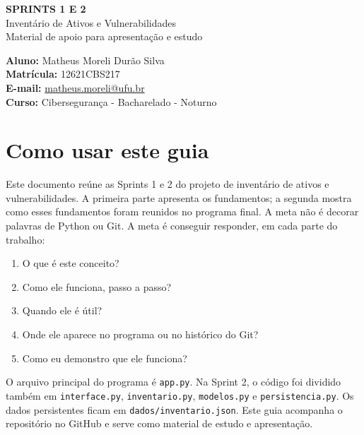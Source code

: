 \documentclass[11pt,a4paper]{article}
\begin{document}
\begin{titlepage}
\thispagestyle{empty}
\centering
\vspace*{3.2cm}

{\Large\textbf{SPRINTS 1 E 2}}\\[0.5cm]
{\LARGE Inventário de Ativos e Vulnerabilidades}\\[1.2cm]

{\large Material de apoio para apresentação e estudo}\\[3.2cm]

\begin{flushleft}
\large
\textbf{Aluno:} Matheus Moreli Durão Silva\\[0.35cm]
\textbf{Matrícula:} 12621CBS217\\[0.35cm]
\textbf{E-mail:} \href{mailto:matheus.moreli@ufu.br}{matheus.moreli@ufu.br}\\[0.35cm]
\textbf{Curso:} Cibersegurança - Bacharelado - Noturno
\end{flushleft}

\vfill
\end{titlepage}

\tableofcontents
\newpage

\section{Como usar este guia}

Este documento reúne as Sprints 1 e 2 do projeto de inventário de ativos e vulnerabilidades. A primeira parte apresenta os fundamentos; a segunda mostra como esses fundamentos foram reunidos no programa final. A meta não é decorar palavras de Python ou Git. A meta é conseguir responder, em cada parte do trabalho:

\begin{enumerate}
  \item O que é este conceito?
  \item Como ele funciona, passo a passo?
  \item Quando ele é útil?
  \item Onde ele aparece no programa ou no histórico do Git?
  \item Como eu demonstro que ele funciona?
\end{enumerate}

O arquivo principal do programa é \texttt{app.py}. Na Sprint 2, o código foi dividido também em \texttt{interface.py}, \texttt{inventario.py}, \texttt{modelos.py} e \texttt{persistencia.py}. Os dados persistentes ficam em \texttt{dados/inventario.json}. Este guia acompanha o repositório no GitHub e serve como material de estudo e apresentação.
\end{document}
